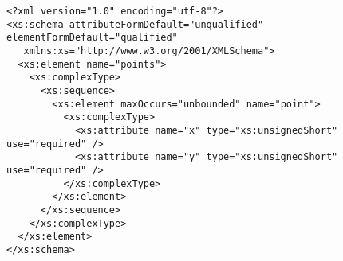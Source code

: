 \documentclass{scrartcl}
\begin{document}
    \lstset{language=XML}
    \begin{lstlisting}
<?xml version="1.0" encoding="utf-8"?>
<xs:schema attributeFormDefault="unqualified" elementFormDefault="qualified"
   xmlns:xs="http://www.w3.org/2001/XMLSchema">
  <xs:element name="points">
    <xs:complexType>
      <xs:sequence>
        <xs:element maxOccurs="unbounded" name="point">
          <xs:complexType>
            <xs:attribute name="x" type="xs:unsignedShort" use="required" />
            <xs:attribute name="y" type="xs:unsignedShort" use="required" />
          </xs:complexType>
        </xs:element>
      </xs:sequence>
    </xs:complexType>
  </xs:element>
</xs:schema>
    \end{lstlisting}
\end{document}
